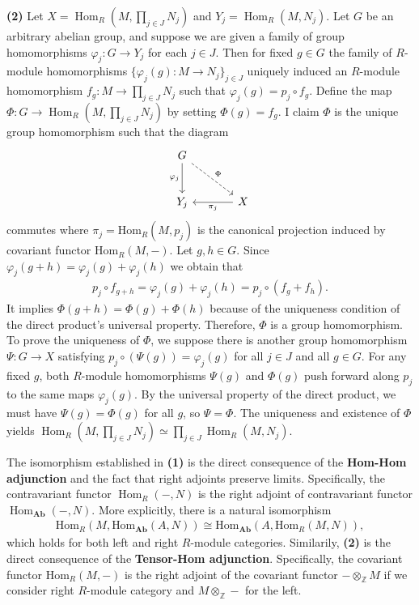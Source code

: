 \begin{solution}
\textbf{(2)} Let $X=\operatorname{Hom}_R\left(M, \prod_{j\in J} N_j\right)$ and $Y_j=\operatorname{Hom}_R(M, N_j)$. Let $G$ be an arbitrary abelian group, and suppose we are given a family of group homomorphisms
$\varphi_j: G \to Y_j$ for each $j \in J$. Then for fixed $g\in G$ the family of $R$-module homomorphisms $\{\varphi_j(g):M\to N_j\}_{j\in J}$ uniquely induced an $R$-module homomorphism
$f_g:M \to \prod_{j\in J} N_j$ such that $\varphi_j(g)= p_j\circ f_g$. Define the map $\Phi:G \to \operatorname{Hom}_R\left(M, \prod_{j\in J} N_j\right)$ by setting $\Phi(g) = f_g$. I claim $\Phi$ is the unique group
homomorphism such that the diagram 
\[
\begin{tikzcd}[ampersand replacement=\&, row sep=large, column sep=large]
    G \arrow[d, "\varphi_j"'] \arrow[dr, "\Phi", dashed] \& \\
    Y_j \& X \arrow[l, "\pi_j"]
\end{tikzcd}
\]
commutes where $\pi_j=\text{Hom}_R(M,p_j)$ is the canonical projection induced by covariant functor $\text{Hom}_R(M,-)$. Let $g, h \in G$. Since $\varphi_j(g+h)= \varphi_j(g)+\varphi_j(h)$ we obtain that
\begin{align*}
    p_j\circ f_{g+h} = \varphi_j(g)+\varphi_j(h) = p_j\circ (f_{g}+f_{h}).
\end{align*}
It implies $\Phi(g+h)=\Phi(g)+\Phi(h)$ because of the uniqueness condition of the direct product's universal property.
Therefore, $\Phi$ is a group homomorphism. To prove the uniqueness of $\Phi$, we suppose
there is another group homomorphism $\Psi: G \to X$ satisfying $p_j\circ (\Psi(g))  = \varphi_j(g)$ for all $j \in J$ and all $g \in G$. For any fixed $g$, both $R$-module homomorphisms $\Psi(g)$ and $\Phi(g)$ push forward along $p_j$ to the same maps $\varphi_j(g)$. 
By the universal property of the direct product, we must have $\Psi(g) = \Phi(g)$ for all $g$, so $\Psi = \Phi$.
The uniqueness and existence of $\Phi$ yields $\operatorname{Hom}_R\left(M, \prod_{j\in J} N_j\right) \simeq \prod_{j\in J} \operatorname{Hom}_R(M, N_j)$.
\end{solution}
\begin{remark}
    The isomorphism established in \textbf{(1)} is the direct consequence of the \textbf{Hom-Hom adjunction} and the fact that right adjoints preserve limits. Specifically, 
    the contravariant functor $\operatorname{Hom}_R(-, N)$ is the right adjoint of contravariant functor $\operatorname{Hom}_{\textbf{Ab}}(-, N)$. 
    More explicitly, there is a natural isomorphism 
    \begin{align*}
        \text{Hom}_R(M,\text{Hom}_\textbf{Ab}(A,N)) \cong \text{Hom}_\textbf{Ab}(A,\text{Hom}_R(M,N)),
    \end{align*}
    which holds for both left and right $R$-module categories.
    Similarily, \textbf{(2)} is the direct consequence of the \textbf{Tensor-Hom adjunction}. Specifically, the covariant functor
    $\text{Hom}_R(M,-)$ is the right adjoint of the covariant functor $-\otimes_\mathbb{Z} M$ if we consider right $R$-module category and $M \otimes_\mathbb{Z} - $ for the left.
\end{remark}


